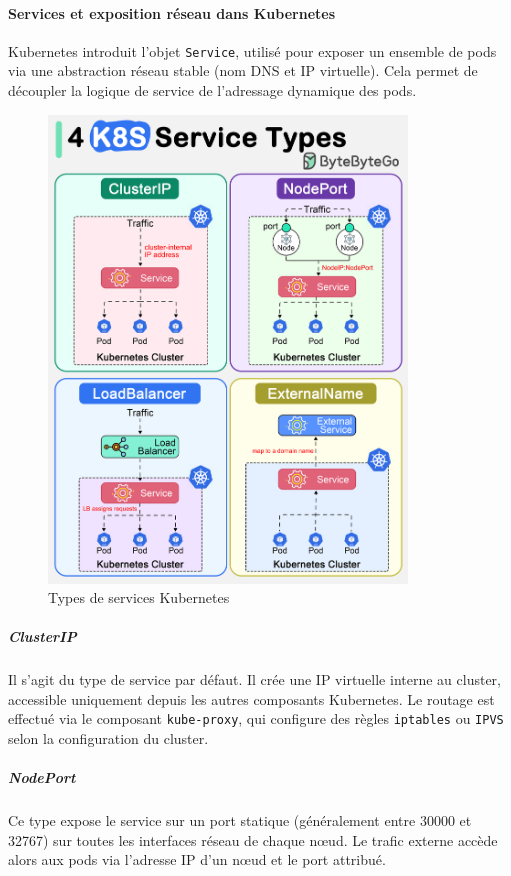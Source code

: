\paragraph{Services et exposition réseau dans Kubernetes}

Kubernetes introduit l’objet \texttt{Service}, utilisé pour exposer un ensemble de pods via une abstraction réseau stable (nom DNS et IP virtuelle). Cela permet de découpler la logique de service de l’adressage dynamique des pods.

\begin{figure}[H]
	\centering
	\includegraphics[width=0.85\textwidth]{figures/k8s-service-types.png}
	\caption{Types de services Kubernetes}
\end{figure}

\subparagraph{ClusterIP}
Il s’agit du type de service par défaut. Il crée une IP virtuelle interne au cluster, accessible uniquement depuis les autres composants Kubernetes. Le routage est effectué via le composant \texttt{kube-proxy}, qui configure des règles \texttt{iptables} ou \texttt{IPVS} selon la configuration du cluster.

\subparagraph{NodePort}
Ce type expose le service sur un port statique (généralement entre 30000 et 32767) sur toutes les interfaces réseau de chaque nœud. Le trafic externe accède alors aux pods via l’adresse IP d’un nœud et le port attribué.

